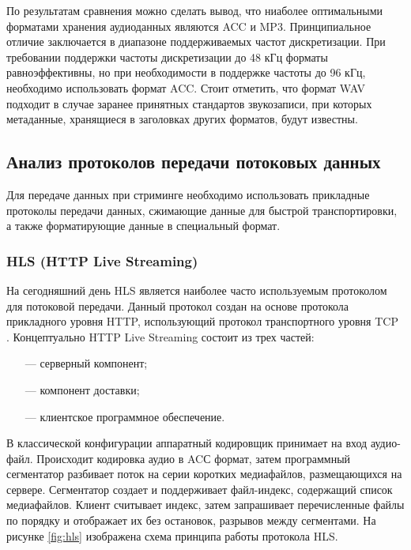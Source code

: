 		\par По результатам сравнения можно сделать вывод, что ниаболее оптимальными форматами хранения аудиоданных являются ACC и MP3.
		Принципиальное отличие заключается в диапазоне поддерживаемых частот дискретизации. 
		При требовании поддержки частоты дискретизации до 48 кГц форматы равноэффективны, но при необходимости в поддержке частоты до 96 кГц,
		необходимо использовать формат ACC.
		Стоит отметить, что формат WAV подходит в случае заранее принятных стандартов звукозаписи,
		при которых метаданные, хранящиеся в заголовках других форматов, будут известны. 

\subsection{Анализ протоколов передачи потоковых данных}

	\par Для передаче данных при стриминге необходимо использовать прикладные протоколы передачи данных,
	сжимающие данные для быстрой транспортировки, а также форматирующие данные в специальный формат.
	
	\subsubsection{HLS (HTTP Live Streaming)}

		\par На сегодняшний день HLS \cite{hls} является наиболее часто используемым протоколом для потоковой передачи. 
		Данный протокол создан на основе протокола прикладного уровня HTTP, использующий протокол транспортного уровня TCP \cite{tcp}.
		Концептуально HTTP Live Streaming состоит из трех частей:
		\begin{itemize}[leftmargin=1.6\parindent]
			\item[---] серверный компонент;
			\item[---] компонент доставки;
			\item[---] клиентское программное обеспечение.
		\end{itemize}

		\par В классической конфигурации аппаратный кодировщик принимает на вход аудио-файл. 
		Происходит кодировка аудио в ACС формат, 
		затем программный сегментатор разбивает поток на серии коротких медиафайлов, размещающихся на сервере. 
		Сегментатор создает и поддерживает файл-индекс, содержащий список медиафайлов. 
		Клиент считывает индекс, затем запрашивает перечисленные файлы по порядку и отображает их без остановок, разрывов между сегментами.
		На рисунке \ref{fig:hls} изображена схема принципа работы протокола HLS.

